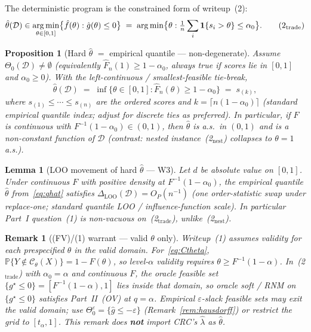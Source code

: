 \documentclass[11pt]{article}
\newtheorem{lemma}{Lemma}
\newtheorem{remark}{Remark}
\newtheorem{proposition}{Proposition}
\begin{document}
The deterministic program is the constrained form of writeup~(2):
\begin{equation}
\hat\theta(\mathcal{D})
\in
\operatorname*{arg\,min}_{\theta\in[0,1]}
\bigl\{\hat f(\theta):\hat g(\theta)\le 0\bigr\}
\;=\;
\operatorname*{arg\,min}\bigl\{\theta:\tfrac1n\sum_i\mathbf{1}\{s_i>\theta\}\le\alpha_0\bigr\}.
\tag{2$_{\mathrm{trade}}$}
\end{equation}

\begin{proposition}[Hard $\hat\theta$ $=$ empirical quantile --- non-degenerate]
\label{prop:quantile}
Assume $\Theta_0(\mathcal{D})\neq\emptyset$ (equivalently $\widehat F_n(1)\ge 1-\alpha_0$, always true if scores lie in $[0,1]$ and $\alpha_0\ge 0$).
With the left-continuous / smallest-feasible tie-break,
\begin{equation}
\label{eq:qhat}
\hat\theta(\mathcal{D})
\;=\;
\inf\bigl\{\theta\in[0,1]:\widehat F_n(\theta)\ge 1-\alpha_0\bigr\}
\;=\;
s_{(k)},
\end{equation}
where $s_{(1)}\le\cdots\le s_{(n)}$ are the ordered scores and
$k=\lceil n(1-\alpha_0)\rceil$ (standard empirical quantile index; adjust for discrete ties as preferred).
In particular, if $F$ is continuous with $F^{-1}(1-\alpha_0)\in(0,1)$, then $\hat\theta$ is a.s.\ in $(0,1)$ and is a non-constant function of $\mathcal{D}$
(contrast: nested instance~(2$_{\mathrm{nest}}$) collapses to $\theta=1$ a.s.).
\end{proposition}

\begin{lemma}[LOO movement of hard $\hat\theta$ --- W3]
\label{lem:loo-trade}
Let $d$ be absolute value on $[0,1]$. Under continuous $F$ with positive density at
$F^{-1}(1-\alpha_0)$, the empirical quantile $\hat\theta$ from~\eqref{eq:qhat} satisfies
$\Delta_{\mathrm{LOO}}(\mathcal{D})=O_P(n^{-1})$
(one order-statistic swap under replace-one; standard quantile LOO / influence-function scale).
In particular Part~I question~(1) is non-vacuous on~(2$_{\mathrm{trade}}$), unlike~(2$_{\mathrm{nest}}$).
\end{lemma}

\begin{remark}[(FV)/(1) warrant --- valid $\theta$ only]
\label{rem:FV}
Writeup~(1) assumes validity for each \emph{prespecified} $\theta$ in the valid domain.
For~\eqref{eq:Ctheta}, $\mathbb{P}\{Y\notin\mathcal{C}_\theta(X)\}=1-F(\theta)$, so
level-$\alpha$ validity requires $\theta\ge F^{-1}(1-\alpha)$.
In~(2$_{\mathrm{trade}}$) with $\alpha_0=\alpha$ and continuous $F$, the oracle feasible set
$\{g^\star\le 0\}=[F^{-1}(1-\alpha),1]$ lies inside that domain, so oracle soft / RNM
on $\{g^\star\le 0\}$ satisfies Part~II~(OV) at $q=\alpha$.
Empirical $\varepsilon$-slack feasible sets may exit the valid domain; use
$\Theta_0^\varepsilon=\{\hat g\le-\varepsilon\}$ (Remark~\ref{rem:hausdorff}) or restrict the
grid to $[t_\alpha,1]$. This remark does \textbf{not} import CRC's $\hat\lambda$ as $\hat\theta$.
\end{remark}
\end{document}

